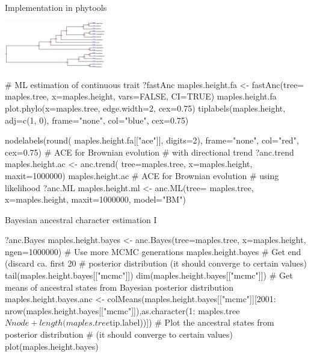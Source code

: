 \documentclass[compress, xelatex, 11pt, xcolor=svgnames, aspectratio=169,
	hyperref={
		bookmarks=true,
		unicode=true,
		colorlinks=true,
		pdftitle={Molecular data in R},
		plainpages=false,
		pdfauthor={Vojtech Zeisek},
		pdfsubject={Course about phylogeny and evolution in R},
		pdfcreator={XeLaTeX},
		pdfkeywords={R, evolution, phylogeny, molecular data},
		linkcolor=Crimson, %
		anchorcolor=Magenta, %
		citecolor=Magenta, %
		filecolor=Magenta, %
		menucolor=Magenta, %
		urlcolor=DodgerBlue, %
		},
	url={hyphens, lowtilde} %
	]{beamer}
\begin{document}
\begin{frame}[fragile]{Implementation in phytools}
	\begin{multicols}{2}
		\vfill
		\begin{center}
			\includegraphics[height=2cm]{ancml.png}
		\end{center}
		\begin{spluscode}
    # ML estimation of continuous trait
    ?fastAnc
    maples.height.fa <- fastAnc(tree=
      maples.tree, x=maples.height,
      vars=FALSE, CI=TRUE)
    maples.height.fa
    plot.phylo(x=maples.tree,
      edge.width=2, cex=0.75)
    tiplabels(maples.height,
      adj=c(1, 0), frame="none",
      col="blue", cex=0.75)
		\end{spluscode}
		\vfill
		\columnbreak
		\begin{spluscode}
    nodelabels(round(
      maples.height.fa[["ace"]],
      digits=2), frame="none",
      col="red", cex=0.75)
    # ACE for Brownian evolution
    # with directional trend
    ?anc.trend
    maples.height.ac <- anc.trend(
      tree=maples.tree,
      x=maples.height, maxit=1000000)
    maples.height.ac
    # ACE for Brownian evolution
    # using likelihood
    ?anc.ML
    maples.height.ml <- anc.ML(tree=
      maples.tree, x=maples.height,
      maxit=1000000, model="BM")
		\end{spluscode}
	\end{multicols}
\end{frame}

\begin{frame}[fragile]{Bayesian ancestral character estimation I}
	\begin{spluscode}
    ?anc.Bayes
    maples.height.bayes <- anc.Bayes(tree=maples.tree, x=maples.height,
      ngen=1000000) # Use more MCMC generations
    maples.height.bayes
    # Get end (discard ca. first 20%
    # posterior distribution (it should converge to certain values)
    tail(maples.height.bayes[["mcmc"]])
    dim(maples.height.bayes[["mcmc"]])
    # Get means of ancestral states from Bayesian posterior distribution
    maples.height.bayes.anc <- colMeans(maples.height.bayes[["mcmc"]][2001:
      nrow(maples.height.bayes[["mcmc"]]),as.character(1:
      maples.tree$Nnode+length(maples.tree$tip.label))])
    # Plot the ancestral states from posterior distribution
    # (it should converge to certain values)
    plot(maples.height.bayes)
	\end{spluscode}
\end{frame}
\end{document}
